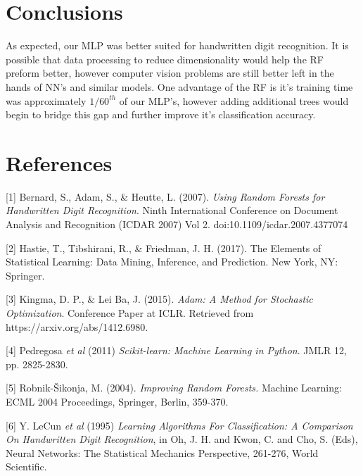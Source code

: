 \documentclass{article}
\begin{document}
\section{Conclusions}
As expected, our MLP was better suited for handwritten digit recognition. It is possible that data processing to reduce dimensionality would help the RF preform better, however computer vision problems are still better left in the hands of NN's and similar models. One advantage of the RF is it's training time was approximately $1/60^{th}$ of our MLP's, however adding additional trees would begin to bridge this gap and further improve it's classification accuracy.

\clearpage

\section*{References}
\medskip

\small

[1] Bernard, S., Adam, S., & Heutte, L. (2007). \textit{Using Random Forests for Handwritten Digit Recognition}. Ninth International Conference on Document Analysis and Recognition (ICDAR 2007) Vol 2. doi:10.1109/icdar.2007.4377074

[2] Hastie, T., Tibshirani, R., & Friedman, J. H. (2017). The Elements of Statistical Learning: Data Mining, Inference, and Prediction. New York, NY: Springer.

[3] Kingma, D. P., & Lei Ba, J. (2015).
\textit{Adam: A Method for Stochastic Optimization}. Conference Paper at ICLR. Retrieved from https://arxiv.org/abs/1412.6980.

[4] Pedregosa \textit{et al} (2011) \textit{Scikit-learn: Machine Learning in Python}. JMLR 12, pp. 2825-2830.

[5] Robnik-Šikonja, M. (2004). \textit{Improving Random Forests.} Machine Learning: ECML 2004 Proceedings, Springer, Berlin, 359-370.

[6] Y. LeCun \textit{et al} (1995) \textit{Learning Algorithms For Classification: A Comparison On Handwritten Digit Recognition}, in Oh, J. H. and Kwon, C. and Cho, S. (Eds), Neural Networks: The Statistical Mechanics Perspective, 261-276, World Scientific.
\end{document}
